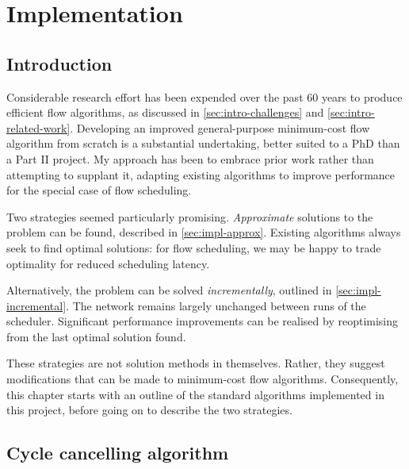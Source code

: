 \chapter{Implementation} \label{chap:impl}


\section{Introduction}


Considerable research effort has been expended over the past 60 years to produce efficient flow algorithms, as discussed in \cref{sec:intro-challenges} and \cref{sec:intro-related-work}. Developing an improved general-purpose minimum-cost flow algorithm from scratch is a substantial undertaking, better suited to a PhD than a Part II project. My approach has been to embrace prior work rather than attempting to supplant it, adapting existing algorithms to improve performance for the special case of flow scheduling.

Two strategies seemed particularly promising. \emph{Approximate} solutions to the problem can be found, described in \cref{sec:impl-approx}. Existing algorithms always seek to find optimal solutions: for flow scheduling, we may be happy to trade optimality for reduced scheduling latency. 

Alternatively, the problem can be solved \emph{incrementally}, outlined in \cref{sec:impl-incremental}. The network remains largely unchanged between runs of the scheduler. Significant performance improvements can be realised by reoptimising from the last optimal solution found.

These strategies are not solution methods in themselves. Rather, they suggest modifications that can be made to minimum-cost flow algorithms. Consequently, this chapter starts with an outline of the standard algorithms implemented in this project, before going on to describe the two strategies.


\section{Cycle cancelling algorithm} \label{sec:impl-cycle-cancelling}

